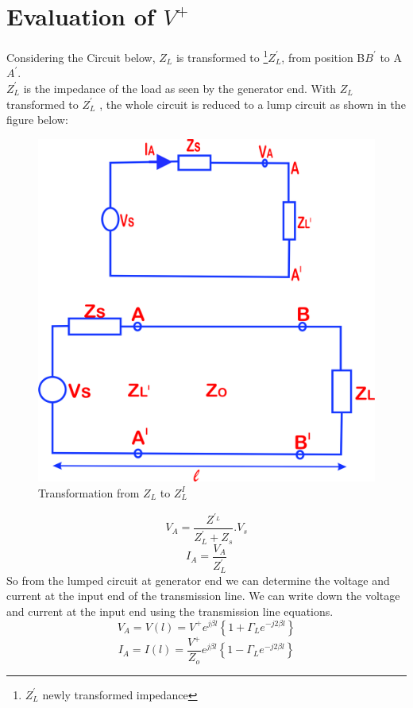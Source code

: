 \section{Evaluation of \textbf{$ V ^ {+} $} } 
Considering the Circuit below, $Z_L$ is transformed to \footnote{$Z^{'}_L$ newly transformed impedance}$Z^{'}_L$, from position B$B^{'}$ to A$A^{'}$.\\
$Z^{'}_L$ is the impedance of the load as seen by the generator end. With $Z_L$ transformed to $Z^{'}_L$ , the whole circuit is reduced to a lump circuit as shown in the figure below:\\
\begin{figure}[h]
\centering
\includegraphics[width=0.5\linewidth]{./graphics/qwerrtt}
\caption{Transformation from $Z_L$ to $Z_{L}^I$}
\label{fig:qwerrtt}
\end{figure}
   	
\begin{equation}
V_A = \frac{Z^{'_L}}{Z^{'}_L + Z_s} . V_s
\end{equation}
\begin{equation}
 I_A = \frac{V_A}{Z^{'}_L}
\end{equation} 
 So from the lumped circuit at generator end we can determine the voltage and current at the input end of the transmission line. We can write down the voltage and current at the input end using the transmission line equations.
 \begin{equation*} 
 V_A= V(l) = V^+ e^{j\beta l} \left\lbrace 1 + \Gamma_L e^{-j2\beta l} \right\rbrace 
 \end{equation*} 
 \begin{equation*}
 I_A = I(l) = \frac{V^+}{Z_o} e^{j\beta l} \left\lbrace 1 - \Gamma_L e^{-j2\beta l} \right\rbrace
 \end{equation*}
 
